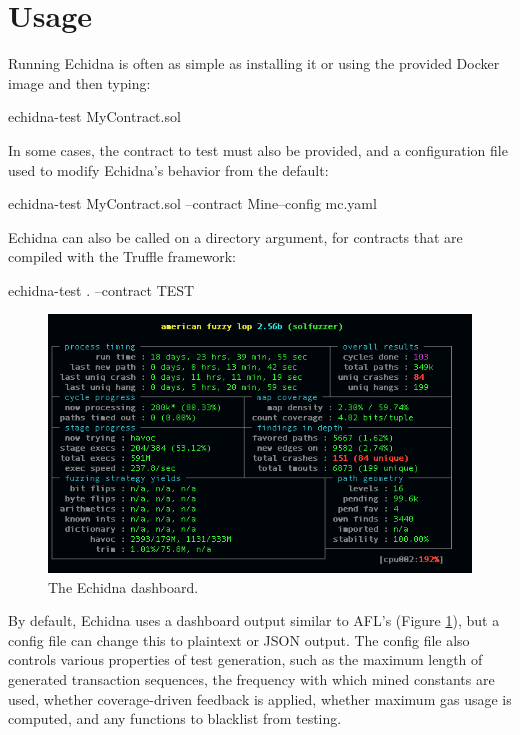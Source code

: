 \section{Usage}

Running Echidna is often as simple as installing it or using the provided Docker image and then typing:

{\scriptsize
\begin{code}
echidna-test MyContract.sol 
\end{code}
}
\noindent In some cases, the contract to test must also be provided, and a configuration file used to modify Echidna's behavior from the default:

{\scriptsize
\begin{code}
echidna-test MyContract.sol --contract Mine--config mc.yaml 
\end{code}
}

\noindent  Echidna can also be called on a directory argument, for contracts that are compiled with the Truffle framework:

{\scriptsize
\begin{code}
echidna-test . --contract TEST
\end{code}
}

\begin{figure}
  \includegraphics[width=0.9\columnwidth]{echidna.png}
  \caption{The Echidna dashboard.}
  \label{fig:dash}
\end{figure}

\noindent By default, Echidna uses a dashboard output similar to AFL's (Figure \ref{fig:dash}), but a config file can change this to plaintext or JSON output.  The config file also controls various properties of test generation, such as the maximum length of generated transaction sequences, the frequency with which mined constants are used, whether coverage-driven feedback is applied, whether maximum gas usage is computed, and any functions to blacklist from testing.  